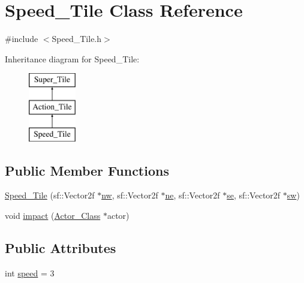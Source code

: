 \hypertarget{class_speed___tile}{}\section{Speed\+\_\+\+Tile Class Reference}
\label{class_speed___tile}


{\ttfamily \#include $<$Speed\+\_\+\+Tile.\+h$>$}

Inheritance diagram for Speed\+\_\+\+Tile\+:\begin{figure}[H]
\begin{center}
\leavevmode
\includegraphics[height=3.000000cm]{class_speed___tile}
\end{center}
\end{figure}
\subsection*{Public Member Functions}
\begin{DoxyCompactItemize}
\item 
\hyperlink{class_speed___tile_a296bb700865d7f78df9cdd830102aafd}{Speed\+\_\+\+Tile} (sf\+::\+Vector2f $\ast$\hyperlink{class_super___tile_ad6bcea1fd54f67808f54ba2aacd88596}{nw}, sf\+::\+Vector2f $\ast$\hyperlink{class_super___tile_a55f6d2860da36f13019bd4e0d18364ca}{ne}, sf\+::\+Vector2f $\ast$\hyperlink{class_super___tile_ab384b89a7a631b8b75c4d405c51a23e1}{se}, sf\+::\+Vector2f $\ast$\hyperlink{class_super___tile_abe9efe0c3d1ed440395225843435dfc8}{sw})
\item 
void \hyperlink{class_speed___tile_aea424ba028f29398ace251a3a664b874}{impact} (\hyperlink{class_actor___class}{Actor\+\_\+\+Class} $\ast$actor)
\end{DoxyCompactItemize}
\subsection*{Public Attributes}
\begin{DoxyCompactItemize}
\item 
int \hyperlink{class_speed___tile_af973cfe789cf50b9622db1fda43efd3c}{speed} = 3
\end{DoxyCompactItemize}


